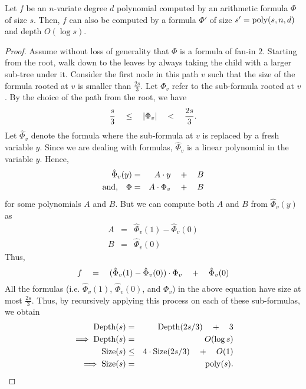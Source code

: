 \begin{lemma}\label{lem:formula-depth-reduction}
Let $f$ be an $n$-variate degree $d$ polynomial computed by an arithmetic formula $\Phi$ of size $s$. 
Then, $f$ can also be computed by a formula $\Phi'$ of size $s' = \operatorname{poly}(s,n,d)$ and depth $O(\log s)$. 
\end{lemma}
\begin{proof}
Assume without loss of generality that $\Phi$ is a formula of fan-in $2$. 
Starting from the root, walk down to the leaves by always taking the child with a larger sub-tree under it. 
Consider the first node in this path $v$ such that the size of the formula rooted at $v$ is smaller than $\frac{2s}{3}$. 
Let $\Phi_v$ refer to the sub-formula rooted at $v$. 
By the choice of the path from the root, we have
\[
\frac{s}{3} \quad \leq \quad \left|\Phi_v\right| \quad < \quad \frac{2s}{3}.
\]
Let $\hat{\Phi}_v$ denote the formula where the sub-formula at $v$ is replaced by a fresh variable $y$. 
Since we are dealing with formulas, $\hat{\Phi}_v$ is a linear polynomial in the variable $y$. 
Hence,
\begin{eqnarray*}
\hat{\Phi}_v(y) & = & A \cdot y \quad + \quad B\\
\text{and,}\quad \Phi & = & A \cdot \Phi_v \quad + \quad B
\end{eqnarray*}
for some polynomials $A$ and $B$. 
But we can compute both $A$ and $B$ from $\hat{\Phi}_v(y)$ as
\begin{eqnarray*}
A & = & \hat{\Phi}_v(1) - \hat{\Phi}_v(0)\\
B & = & \hat{\Phi}_v(0)
\end{eqnarray*}
Thus, 
\[
f \quad = \quad (\hat{\Phi}_v(1) - \hat{\Phi}_v(0))\cdot \Phi_v \quad + \quad \hat{\Phi}_v(0)
\]
All the formulas (i.e. $\hat{\Phi}_v(1)$, $\hat{\Phi}_v(0)$, and $\Phi_v$) in the above equation have size at most $\frac{2s}{3}$. 
Thus, by recursively applying this process on each of these sub-formulas, we obtain
\begin{eqnarray*}
\mathrm{Depth}(s) & = & \mathrm{Depth}(2s/3) \quad + \quad 3\\
\implies \mathrm{Depth}(s) &=& O(\log s)\\
\mathrm{Size}(s) & \leq & 4\cdot \mathrm{Size}(2s/3) \quad + \quad O(1)\\
\implies \mathrm{Size}(s) &=& \operatorname{poly}(s).
\end{eqnarray*}
\end{proof}

